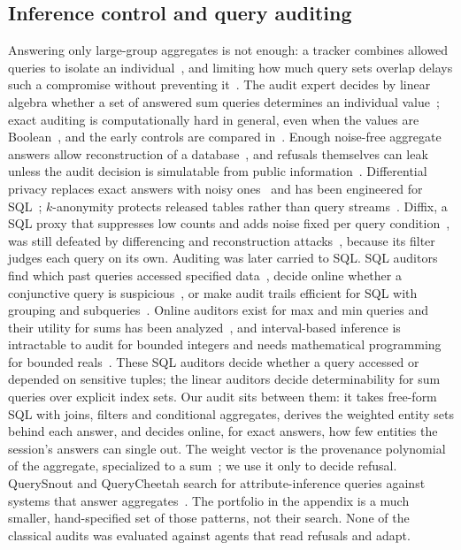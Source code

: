 \documentclass[sigconf,nonacm]{acmart}
\begin{document}
\subsection{Inference control and query auditing}
Answering only large-group aggregates is not enough: a tracker combines allowed queries to isolate an individual~\cite{denning1979tracker}, and limiting how much query sets overlap delays such a compromise without preventing it~\cite{dobkin1979secure}. The audit expert decides by linear algebra whether a set of answered sum queries determines an individual value~\cite{chin1982auditing}; exact auditing is computationally hard in general, even when the values are Boolean~\cite{kleinberg2003boolean}, and the early controls are compared in~\cite{adam1989security}. Enough noise-free aggregate answers allow reconstruction of a database~\cite{dinur2003revealing}, and refusals themselves can leak unless the audit decision is simulatable from public information~\cite{kenthapadi2005simulatable}. Differential privacy replaces exact answers with noisy ones~\cite{dwork2006calibrating} and has been engineered for SQL~\cite{johnson2018flex}; $k$-anonymity protects released tables rather than query streams~\cite{sweeney2002kanonymity}. Diffix, a SQL proxy that suppresses low counts and adds noise fixed per query condition~\cite{francis2017diffix}, was still defeated by differencing and reconstruction attacks~\cite{gadotti2019diffix,cohen2020reconstruction}, because its filter judges each query on its own. Auditing was later carried to SQL. SQL auditors find which past queries accessed specified data~\cite{agrawal2004auditing}, decide online whether a conjunctive query is suspicious~\cite{motwani2008auditing}, or make audit trails efficient for SQL with grouping and subqueries~\cite{kaushik2011auditing}. Online auditors exist for max and min queries and their utility for sums has been analyzed~\cite{nabar2006robustness,nabar2008survey}, and interval-based inference is intractable to audit for bounded integers and needs mathematical programming for bounded reals~\cite{li2002interval}. These SQL auditors decide whether a query accessed or depended on sensitive tuples; the linear auditors decide determinability for sum queries over explicit index sets. Our audit sits between them: it takes free-form SQL with joins, filters and conditional aggregates, derives the weighted entity sets behind each answer, and decides online, for exact answers, how few entities the session's answers can single out. The weight vector is the provenance polynomial of the aggregate, specialized to a sum~\cite{green2007provenance,buneman2001provenance}; we use it only to decide refusal. QuerySnout and QueryCheetah search for attribute-inference queries against systems that answer aggregates~\cite{cretu2022querysnout,stevanoski2024querycheetah}. The portfolio in the appendix is a much smaller, hand-specified set of those patterns, not their search. None of the classical audits was evaluated against agents that read refusals and adapt.
\end{document}
